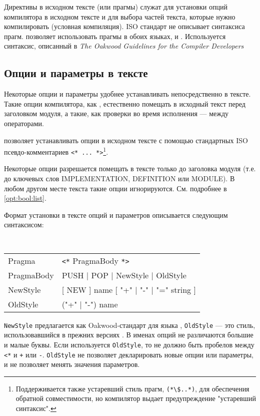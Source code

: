 Директивы в исходном тексте (или прагмы) служат для установки опций 
компилятора в исходном тексте и для выбора частей текста, которые нужно
компилировать (условная компиляция).
ISO \mt{} стандарт не описывает синтаксиса прагм.
\XDS{} позволяет использовать прагмы в обоих языках,
\mt{} и \ot{}. Используется синтаксис, описанный в
{\em The Oakwood Guidelines for the \ot{} Compiler Developers}

\subsection{Опции и параметры в тексте}\label{m2:pragmas:inline}

Некоторые опции и параметры удобнее устанавливать непосредственно в тексте.
Такие опции компилятора, как
, естественно помещать в исходный текст перед 
заголовком модуля, а такие, как проверки во время исполнения ---
между операторами.

\xds{} позволяет устанавливать опции в исходном тексте с помощью
стандартных
ISO псевдо-комментариев \verb|<* ... *>|\footnote{Поддерживается также
устаревший стиль прагм,
\verb|(*\$..*)|, для обеспечения обратной совместимости,
но компилятор выдает предупреждение "устаревший синтаксис".}.

Некоторые опции разрешается помещать в тексте только до заголовка
модуля (т.е. до ключевых слов IMPLEMENTATION, DEFINITION или MODULE).
В любом другом месте текста такие опции игнорируются.
См. подробнее в \ref{opt:bool:list}.

Формат установки в тексте опций и параметров описывается следующим 
синтаксисом:
\begin{flushleft} \tt
\begin{tabular}{l@{= }p{10cm}}
Pragma      & \verb|<*| PragmaBody \verb|*>| \\
PragmaBody  & PUSH $|$ POP $|$ NewStyle $|$ OldStyle \\
NewStyle    & [ NEW ] name [ "+" $|$ "-" $|$ "=" string ] \\
OldStyle    & ("+" $|$ "-") name \\
\end{tabular}
\end{flushleft}

{\tt NewStyle} предлагается как Oakwood-стандарт для языка \ot{},
{\tt OldStyle} --- это стиль, использовавшийся в прежних версиях
\xds{}. В именах опций не различаются большие и малые буквы.
Если используется {\tt OldStyle}, то не должно быть пробелов
между \verb|<*| и \verb|+| или \verb|-|.
{\tt OldStyle} не позволяет декларировать новые опции или параметры,
и не позволяет менять значения параметров.

